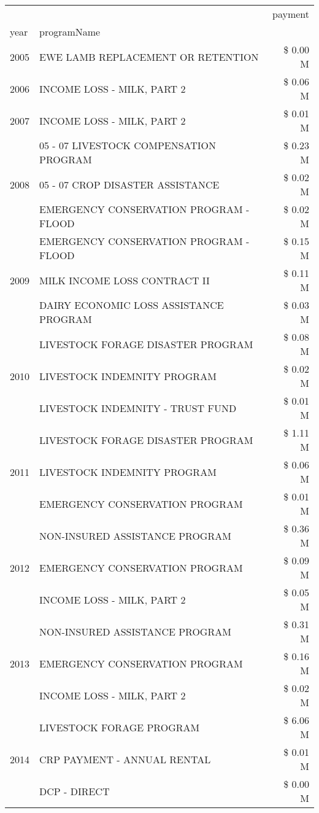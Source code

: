 \begin{tabular}{llr}
\toprule
 &  & payment \\
year & programName &  \\
\midrule
2005 & EWE LAMB REPLACEMENT OR RETENTION & \$ 0.00 M \\
\cline{1-3}
2006 & INCOME LOSS - MILK, PART 2 & \$ 0.06 M \\
\cline{1-3}
2007 & INCOME LOSS - MILK, PART 2 & \$ 0.01 M \\
\cline{1-3}
\multirow[t]{3}{*}{2008} & 05 - 07 LIVESTOCK COMPENSATION PROGRAM & \$ 0.23 M \\
 & 05 - 07 CROP DISASTER ASSISTANCE & \$ 0.02 M \\
 & EMERGENCY CONSERVATION PROGRAM - FLOOD & \$ 0.02 M \\
\cline{1-3}
\multirow[t]{3}{*}{2009} & EMERGENCY CONSERVATION PROGRAM - FLOOD & \$ 0.15 M \\
 & MILK INCOME LOSS CONTRACT II & \$ 0.11 M \\
 & DAIRY ECONOMIC LOSS ASSISTANCE PROGRAM & \$ 0.03 M \\
\cline{1-3}
\multirow[t]{3}{*}{2010} & LIVESTOCK FORAGE DISASTER PROGRAM & \$ 0.08 M \\
 & LIVESTOCK INDEMNITY PROGRAM & \$ 0.02 M \\
 & LIVESTOCK INDEMNITY - TRUST FUND & \$ 0.01 M \\
\cline{1-3}
\multirow[t]{3}{*}{2011} & LIVESTOCK FORAGE DISASTER PROGRAM & \$ 1.11 M \\
 & LIVESTOCK INDEMNITY PROGRAM & \$ 0.06 M \\
 & EMERGENCY CONSERVATION PROGRAM & \$ 0.01 M \\
\cline{1-3}
\multirow[t]{3}{*}{2012} & NON-INSURED ASSISTANCE PROGRAM & \$ 0.36 M \\
 & EMERGENCY CONSERVATION PROGRAM & \$ 0.09 M \\
 & INCOME LOSS - MILK, PART 2 & \$ 0.05 M \\
\cline{1-3}
\multirow[t]{3}{*}{2013} & NON-INSURED ASSISTANCE PROGRAM & \$ 0.31 M \\
 & EMERGENCY CONSERVATION PROGRAM & \$ 0.16 M \\
 & INCOME LOSS - MILK, PART 2 & \$ 0.02 M \\
\cline{1-3}
\multirow[t]{3}{*}{2014} & LIVESTOCK FORAGE PROGRAM & \$ 6.06 M \\
 & CRP PAYMENT - ANNUAL RENTAL & \$ 0.01 M \\
 & DCP - DIRECT & \$ 0.00 M \\

\end{tabular}
